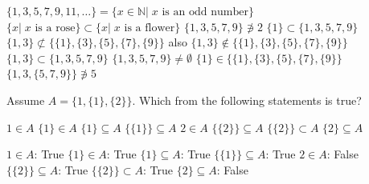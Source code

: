 \begin{Answer}\phantom{}

    		\Question $\{1, 3, 5, 7, 9, 11, \ldots \} = \{ x \in \mathbb{N} | \; x \text{ is an odd number} \}$
    		\Question $\{ x | \; x \text{ is a rose} \} \subset \{ x | \; x \text{ is a flower} \}$
    		\Question $\{1, 3, 5, 7, 9 \} \not\ni 2$
    		\Question $\{1\} \subset \{1, 3, 5, 7, 9 \} $
    		\Question $\{1,3\} \not\subset \{\{1\}, \{3\}, \{5\}, \{7\}, \{9\} \} $ also $\{1,3\} \not\in \{\{1\}, \{3\}, \{5\}, \{7\}, \{9\} \} $
    		\Question $\{1,3\} \subset \{1, 3, 5, 7, 9 \} $
    		\Question $\{1, 3, 5, 7, 9 \} \neq \emptyset$
    		\Question $\{1\} \in \{\{1\}, \{3\}, \{5\}, \{7\}, \{9\} \} $
    		\Question $\{1, 3, \{5, 7, 9\} \} \not\ni 5$

\end{Answer}

\newpage

\begin{Exercise} Assume $A=\{1, \{1\}, \{2\} \}$. Which from the following statements is true?
    \begin{multicols}{2}
    	\Question[difficulty = 1] $1 \in A$
    	\ifanalysis\Question[difficulty = 1]\fi \ifcalculus\Question[difficulty = 2]\fi $\{1\} \in A$
    	\ifanalysis\Question[difficulty = 1]\fi \ifcalculus\Question[difficulty = 2]\fi $\{1\} \subseteq A$
    	\ifanalysis\Question[difficulty = 1]\fi \ifcalculus\Question[difficulty = 2]\fi $\{\{1\}\} \subseteq A$
    	\ifanalysis\Question[difficulty = 1]\fi \ifcalculus\Question[difficulty = 2]\fi $2 \in A$
    	\ifanalysis\Question[difficulty = 1]\fi \ifcalculus\Question[difficulty = 2]\fi $\{\{2\}\} \subseteq A$	
    	\ifanalysis\Question[difficulty = 1]\fi \ifcalculus\Question[difficulty = 2]\fi $\{\{2\}\} \subset A$
    	\Question[difficulty = 2] $\{2\} \subseteq A$
    	\EndCurrentQuestion
	\end{multicols}
\end{Exercise}

\begin{Answer}\phantom{}
    \begin{multicols}{2}
        
        	\Question $1 \in A$: True
        	\Question $\{1\} \in A$: True
        	\Question $\{1\} \subseteq A$: True
        	\Question $\{\{1\}\} \subseteq A$: True
        	\Question $2  \in A$: False 
        	\Question $\{\{2\}\} \subseteq A$: True	
        	\Question $\{\{2\}\} \subset A$: True	
        	\Question $\{2\} \subseteq A$: False
        \EndCurrentQuestion
    \end{multicols}
\end{Answer}

